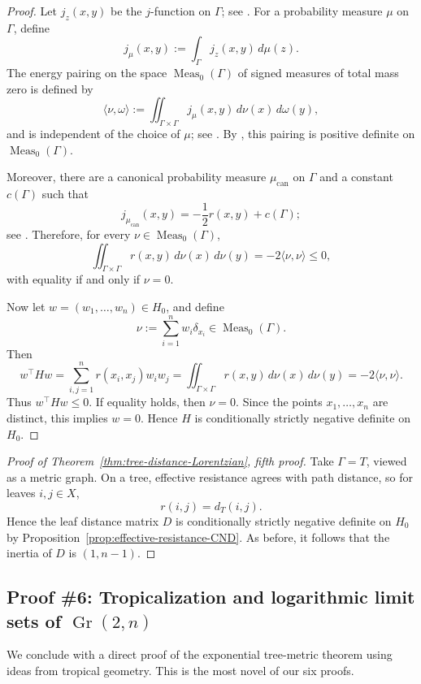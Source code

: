 \documentclass[12pt]{amsart}
\theoremstyle{definition}
\newcommand{\1}{\mathbf{1}}
\DeclareMathOperator{\Gr}{Gr}
\begin{document}
\begin{proof}
Let $j_z(x,y)$ be the $j$-function on $\Gamma$; see
\cite[Corollary 3]{Baker-Faber06}.  For a probability measure $\mu$ on $\Gamma$,
define
\[
j_\mu(x,y):=\int_\Gamma j_z(x,y)\,d\mu(z).
\]
The energy pairing on the space $\operatorname{Meas}_0(\Gamma)$ of signed measures of total mass zero is defined by
\[
\langle \nu,\omega\rangle
:=
\iint_{\Gamma\times\Gamma} j_\mu(x,y)\,d\nu(x)\,d\omega(y),
\]
and is independent of the choice of $\mu$; see \cite[Section 10]{Baker-Rumely07}.
By \cite[Theorem 10.4]{Baker-Rumely07}, this pairing is positive definite on
$\operatorname{Meas}_0(\Gamma)$.

Moreover, there are a canonical probability measure $\mu_{\mathrm{can}}$ on $\Gamma$
and a constant $c(\Gamma)$ such that
\[
j_{\mu_{\mathrm{can}}}(x,y)
=
-\frac12 r(x,y)+c(\Gamma);
\]
see \cite[Theorem 14.1]{Baker-Rumely07}.  Therefore, for every
$\nu\in\operatorname{Meas}_0(\Gamma)$,
\[
\iint_{\Gamma\times\Gamma} r(x,y)\,d\nu(x)\,d\nu(y)
=
-2\langle \nu,\nu\rangle
\le 0,
\]
with equality if and only if $\nu=0$.

Now let $w=(w_1,\dots,w_n)\in H_0$, and define
\[
\nu:=\sum_{i=1}^n w_i\delta_{x_i}\in\operatorname{Meas}_0(\Gamma).
\]
Then
\[
w^\top H w
=
\sum_{i,j=1}^n r(x_i,x_j)w_iw_j
=
\iint_{\Gamma\times\Gamma} r(x,y)\,d\nu(x)\,d\nu(y)
=
-2\langle \nu,\nu\rangle.
\]
Thus $w^\top H w\le 0$.  If equality holds, then $\nu=0$.  Since the points
$x_1,\dots,x_n$ are distinct, this implies $w=0$.  Hence $H$ is conditionally
strictly negative definite on $H_0$.
\end{proof}

\begin{proof}[Proof of Theorem~\ref{thm:tree-distance-Lorentzian}, fifth proof]
Take $\Gamma=T$, viewed as a metric graph.  On a tree, effective resistance agrees
with path distance, so for leaves $i,j\in X$,
\[
r(i,j)=d_T(i,j).
\]
Hence the leaf distance matrix $D$ is conditionally strictly negative definite on
$H_0$ by Proposition~\ref{prop:effective-resistance-CND}.
As before, it follows that the inertia of $D$ is $(1,n-1)$.
\end{proof}

\subsection{Proof \#6: Tropicalization and logarithmic limit sets of \texorpdfstring{$\Gr(2,n)$}{Gr(2,n)}}
\label{app:tropical-proof}

We conclude with a direct proof of the exponential tree-metric theorem using ideas from tropical
geometry. This is the most novel of our six proofs.
\end{document}
